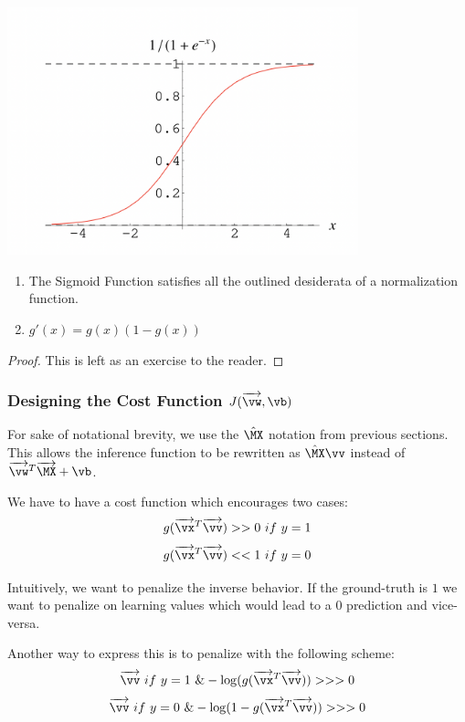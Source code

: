 \begin{enumerate}
    \begin{center}
    \includegraphics[width=4in]{images/Chapter6/sigmoid.png}
    \end{center}
    \begin{proposition}
    \begin{enumerate}
        \item The Sigmoid Function satisfies all the outlined desiderata of a normalization function.
        \item $g'(x) = g(x)(1 - g(x))$
    \end{enumerate}
    \end{proposition}
    
    \begin{proof}
    This is left as an exercise to the reader.
    \end{proof}
    
    \subsubsection{Designing the Cost Function $J(\overrightarrow{\vw}, \vb)$}
    For sake of notational brevity, we use the $\hat{\MX}$ notation from previous sections. This allows the inference function to be rewritten as $\hat{\MX}\vv$ instead of $\overrightarrow{\vw}^T \overrightarrow{\MX} + \vb$.
    

    We have to have a cost function which encourages two cases: $$g(\overrightarrow{\vx}^T\overrightarrow{\vv}) >> 0 \  {if} \  y = 1$$
    $$g(\overrightarrow{\vx}^T\overrightarrow{\vv}) << 1 \  {if} \  y = 0$$
    
    Intuitively, we want to penalize the inverse behavior. If the ground-truth is $1$ we want to penalize on learning values which would lead to a $0$ prediction and vice-versa.
    
    Another way to express this is to penalize with the following scheme:
    $$\overrightarrow{\vv} \ {if} \  y = 1 \ \& -\log(g(\overrightarrow{\vx}^T\overrightarrow{\vv})) >>> 0$$
    $$\overrightarrow{\vv} \ {if} \  y = 0 \ \& -\log(1 - g(\overrightarrow{\vx}^T\overrightarrow{\vv})) >>> 0$$ 
    

\end{enumerate}
